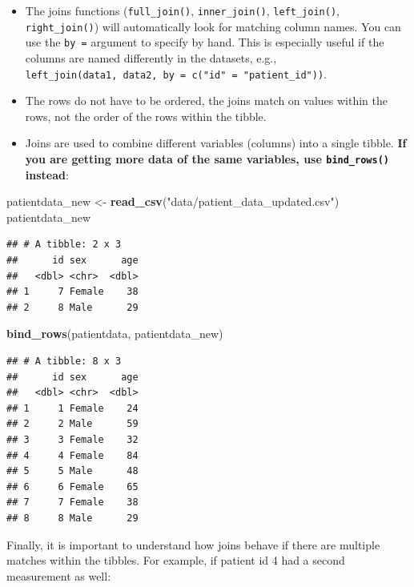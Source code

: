 \documentclass[
  12pt,
  krantz2]{krantz}
\makeatletter
\newenvironment{Shaded}{\begin{snugshade}}{\end{snugshade}}
\newcommand{\KeywordTok}[1]{\textcolor[rgb]{0.13,0.29,0.53}{\textbf{#1}}}
\newcommand{\NormalTok}[1]{#1}
\newcommand{\StringTok}[1]{\textcolor[rgb]{0.31,0.60,0.02}{#1}}
\newenvironment{kframe}{%
\medskip{}
\setlength{\fboxsep}{.8em}
 \def\at@end@of@kframe{}%
 \ifinner\ifhmode%
  \def\at@end@of@kframe{\end{minipage}}%
  \begin{minipage}{\columnwidth}%
 \fi\fi%
 \def\FrameCommand##1{\hskip\@totalleftmargin \hskip-\fboxsep
 \colorbox{shadecolor}{##1}\hskip-\fboxsep
     \hskip-\linewidth \hskip-\@totalleftmargin \hskip\columnwidth}%
 \MakeFramed {\advance\hsize-\width
   \@totalleftmargin\z@ \linewidth\hsize
   \@setminipage}}%
 {\par\unskip\endMakeFramed%
 \at@end@of@kframe}
\renewenvironment{Shaded}{\begin{kframe}}{\end{kframe}}
\makeatother
\begin{document}
\begin{itemize}
\item
  The joins functions (\texttt{full\_join()}, \texttt{inner\_join()}, \texttt{left\_join()}, \texttt{right\_join()}) will automatically look for matching column names. You can use the \texttt{by\ =} argument to specify by hand. This is especially useful if the columns are named differently in the datasets, e.g., \texttt{left\_join(data1,\ data2,\ by\ =\ c("id"\ =\ "patient\_id"))}.
\item
  The rows do not have to be ordered, the joins match on values within the rows, not the order of the rows within the tibble.
\item
  Joins are used to combine different variables (columns) into a single tibble. \textbf{If you are getting more data of the same variables, use \texttt{bind\_rows()} instead}:
\end{itemize}

\begin{Shaded}
\begin{Highlighting}[]
\NormalTok{patientdata_new <-}\StringTok{ }\KeywordTok{read_csv}\NormalTok{(}\StringTok{"data/patient_data_updated.csv"}\NormalTok{)}
\NormalTok{patientdata_new}
\end{Highlighting}
\end{Shaded}

\begin{verbatim}
## # A tibble: 2 x 3
##      id sex      age
##   <dbl> <chr>  <dbl>
## 1     7 Female    38
## 2     8 Male      29
\end{verbatim}

\begin{Shaded}
\begin{Highlighting}[]
\KeywordTok{bind_rows}\NormalTok{(patientdata, patientdata_new)}
\end{Highlighting}
\end{Shaded}

\begin{verbatim}
## # A tibble: 8 x 3
##      id sex      age
##   <dbl> <chr>  <dbl>
## 1     1 Female    24
## 2     2 Male      59
## 3     3 Female    32
## 4     4 Female    84
## 5     5 Male      48
## 6     6 Female    65
## 7     7 Female    38
## 8     8 Male      29
\end{verbatim}

Finally, it is important to understand how joins behave if there are multiple matches within the tibbles. For example, if patient id 4 had a second measurement as well:
\end{document}
